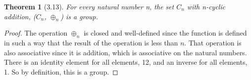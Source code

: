 \documentclass{article}
\newtheorem*{thm}{Theorem}
\begin{document}
\begin{thm}[3.13]
	For every natural number n, the set $C_n$ with n-cyclic addition, ($C_n$, $\oplus_n$) is a group.
\end{thm}
\begin{proof}
	The operation $\oplus_n$ is closed and well-defined since the function is defined in such a way that the result of the operation is less than $n$. That operation is also associative since it is addition, which is associative on the 
	natural numbers. There is an identity element for all elements, 12, and an inverse for all elements, 1. So by definition, this is a group.
\end{proof}
\end{document}
